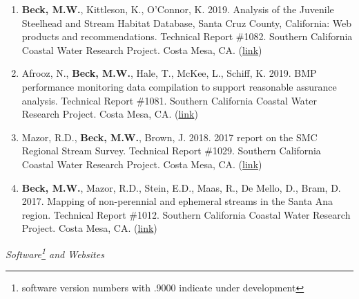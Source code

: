 \documentclass[letterpaper,12pt]{article}
\begin{document}
\begin{enumerate}
\item \textbf{Beck, M.W.}, Kittleson, K., O'Connor, K. 2019. Analysis of the Juvenile Steelhead and Stream Habitat Database, Santa Cruz County, California: Web products and recommendations. Technical Report \#1082. Southern California Coastal Water Research Project. Costa Mesa, CA. ({\footnotesize\href{http://ftp.sccwrp.org/pub/download/DOCUMENTS/TechnicalReports/1082_SantaCruzSteelheads.pdf}{link}})

\item Afrooz, N., \textbf{Beck, M.W.}, Hale, T., McKee, L., Schiff, K. 2019. BMP performance monitoring data compilation to support reasonable assurance analysis. Technical Report \#1081. Southern California Coastal Water Research Project. Costa Mesa, CA. ({\footnotesize\href{http://ftp.sccwrp.org/pub/download/DOCUMENTS/TechnicalReports/1081_BMPPerformanceRAA.pdf}{link}})

\item Mazor, R.D., \textbf{Beck, M.W.}, Brown, J. 2018. 2017 report on the SMC Regional Stream Survey. Technical Report \#1029. Southern California Coastal Water Research Project. Costa Mesa, CA. ({\footnotesize\href{http://ftp.sccwrp.org/pub/download/DOCUMENTS/TechnicalReports/1029_2017SMCReport.pdf}{link}})

\item \textbf{Beck, M.W.}, Mazor, R.D., Stein, E.D., Maas, R., De Mello, D., Bram, D. 2017. Mapping of non-perennial and ephemeral streams in the Santa Ana region. Technical Report \#1012. Southern California Coastal Water Research Project. Costa Mesa, CA. ({\footnotesize\href{http://ftp.sccwrp.org/pub/download/DOCUMENTS/TechnicalReports/1012_MappingStreamsSantaAna.pdf}{link}})

\end{enumerate}

\vspace{\baselineskip} 
\centerline{\large{\textit{Software\footnote{software version numbers with .9000 indicate under development} and Websites}}}
\end{document}
